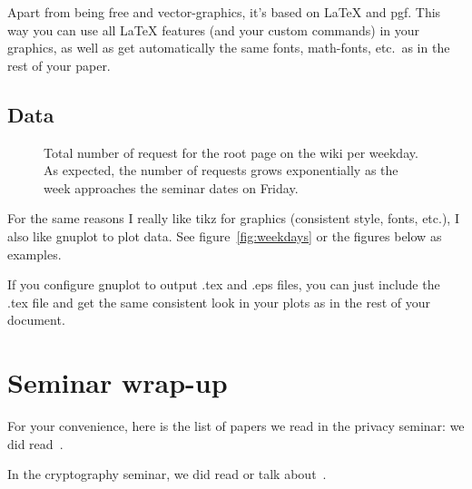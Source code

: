 \documentclass[twocolumn, a4paper, 10pt]{article}
\begin{document}
Apart from being free and vector-graphics, it's based on \LaTeX{} and pgf. This way you can use all \LaTeX{} features (and your custom commands) in your graphics, as well as get automatically the same fonts, math-fonts, etc.\ as in the rest of your paper. 


\subsection{Data}

\begin{figure}
	
	\caption{Total number of request for the root page on the wiki per weekday. As expected, the number of requests grows exponentially as the week approaches the seminar dates on Friday.}
	\label{plot:weekdays}
\end{figure}

For the same reasons I really like tikz for graphics (consistent style, fonts, etc.), I also like gnuplot to plot data.
See figure~\ref{fig:weekdays} or the figures below as examples. 

If you configure gnuplot to output .tex and .eps files, you can just include the .tex file and get the same consistent look in your plots as in the rest of your document.


\section{Seminar wrap-up}
For your convenience, here is the list of papers we read in the privacy seminar: we did read~\cite{
solove2011privacy,
brin1999transparent,
oulasvirta2012long,
chaum1985security,
narayanan2013happened1,
narayanan2013happened2,
chaum1981untraceable,
dingeldine2004tor,
wolinsky2013hang,
juarez2014critical,
Mor2015bloom4,
yekhanin2010private,
camenisch2012electronic,
gervais2014privacy,
bonneau2014mixcoin,
starov2015measuring,
sweeney2002k,
nissenbaum2011contextual,
nissenbaum2004privacy,
narayanan2011link,
dwork2011differential,
homer2008resolving,
kelley2009nutrition,
reznichenko2014private,
kaptein2012rethinking,
afroz2014doppelganger,
chaum2004secret,
acquisti2015privacy,
jagatic2007social,
kang2011self}.

In the cryptography seminar, we did read or talk about~\cite{
koblitz2007another,
koblitz2007another2,
chatterjee2012another,
blum1983coin,
goldwasser1985knowledge,
rabin2005exchange,
rogaway2009practice,
koblitz2007uneasy,
bellare1998practice,
goldreich1987play,
fischer1996secure,
even1985randomized,
shamir1979share,
lindell2009proof,
holzer2012secure,
yao1986generate,
ben2008fairplaymp,
chaum1988multiparty,
rivest2001leak,
kushilevitz1997replication,
yekhanin2010private,
benaloh1994one,
miers2013zerocoin,
stefanov2013path,
bernstein2009introduction,
shor1997polynomial,
fiat1994broadcast,
micciancio2011lattice,
chor1994tracing,
juels2014honey,
blocki2014human,
di2005secure}.
\end{document}
